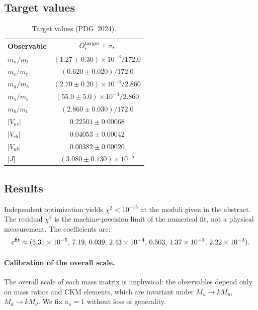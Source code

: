 \documentclass[12pt,a4paper]{article}
\numberwithin{equation}{section}
\begin{document}
\subsection{Target values}
\begin{table}[H]
\centering
\caption{Target values (PDG~2024).}
\begin{tabular}{lc}
\toprule
Observable & \(O_i^{\rm target} \pm \sigma_i\) \\
\midrule
\(m_u/m_t\) & \((1.27 \pm 0.30)\times10^{-3}/172.0\) \\
\(m_c/m_t\) & \((0.620 \pm 0.020)/172.0\) \\
\(m_d/m_b\) & \((2.70 \pm 0.20)\times10^{-3}/2.860\) \\
\(m_s/m_b\) & \((55.0 \pm 5.0)\times10^{-3}/2.860\) \\
\(m_b/m_t\) & \((2.860 \pm 0.030)/172.0\) \\
\(|V_{us}|\) & \(0.22501 \pm 0.00068\) \\
\(|V_{cb}|\) & \(0.04053 \pm 0.00042\) \\
\(|V_{ub}|\) & \(0.00382 \pm 0.00020\) \\
\(|J|\) & \((3.080 \pm 0.130)\times10^{-5}\) \\
\bottomrule
\end{tabular}
\end{table}

\subsection{Results}
Independent optimization yields \(\chi^2 < 10^{-15}\) at the moduli given in the abstract. The residual \(\chi^2\) is the machine-precision limit of the numerical fit, not a physical measurement. The coefficients are:
\begin{equation}
c^{\rm fit} \approx (5.31\times10^{-5},\,7.19,\,0.039,\,2.43\times10^{-4},\,0.503,\,1.37\times10^{-3},\,2.22\times10^{-3}).
\end{equation}

\paragraph{Calibration of the overall scale.}
The overall scale of each mass matrix is unphysical: the observables depend
only on mass ratios and CKM elements, which are invariant under
\(M_u \to k M_u\), \(M_d \to k M_d\). We fix \(a_u = 1\) without loss of generality.
\end{document}
